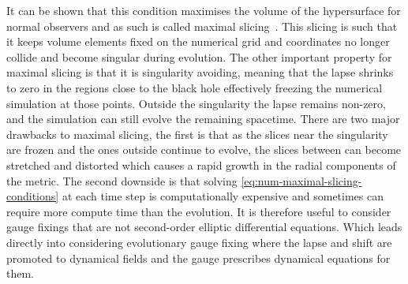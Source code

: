 \documentclass[10pt]{report}
\theoremstyle{definition}
\begin{document}
It can be shown that this condition maximises the volume of the hypersurface for normal observers and as such is called maximal slicing~\cite{Maximally_Slici_Estabr_1973}. This slicing is such that it keeps volume elements fixed on the numerical grid and coordinates no longer collide and become singular during evolution. The other important property for maximal slicing is that it is singularity avoiding, meaning that the lapse shrinks to zero in the regions close to the black hole effectively freezing the numerical simulation at those points. Outside the singularity the lapse remains non-zero, and the simulation can still evolve the remaining spacetime. There are two major drawbacks to maximal slicing, the first is that as the slices near the singularity are frozen and the ones outside continue to evolve, the slices between can become stretched and distorted which causes a rapid growth in the radial components of the metric. The second downside is that solving \cref{eq:num-maximal-slicing-conditions} at each time step is computationally expensive and sometimes can require more compute time than the evolution. It is therefore useful to consider gauge fixings that are not second-order elliptic differential equations. Which leads directly into considering evolutionary gauge fixing where the lapse and shift are promoted to dynamical fields and the gauge prescribes dynamical equations for them.
\end{document}
